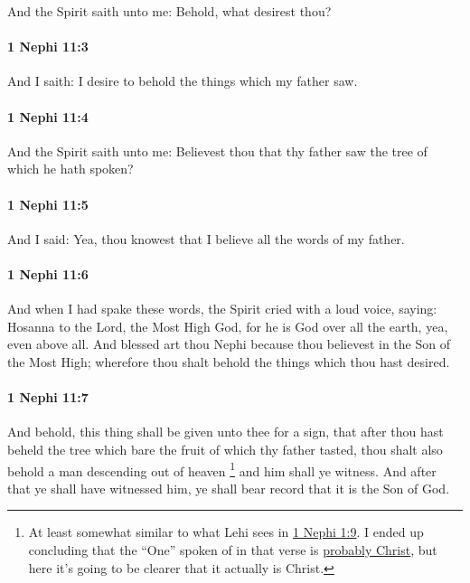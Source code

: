 			And the Spirit saith unto me:
			Behold, what desirest thou?

		\paragraph{1 Nephi 11:3} %
			\label{1NEPHI-11-3}

			And I saith:
			I desire to behold the things which my father saw.

		\paragraph{1 Nephi 11:4} %
			\label{1NEPHI-11-4}

			And the Spirit saith unto me:
			Believest thou that thy father saw the tree of which he hath spoken?

		\paragraph{1 Nephi 11:5} %
			\label{1NEPHI-11-5}

			And I said:
			Yea, thou knowest that I believe all the words of my father.

		\paragraph{1 Nephi 11:6} %
			\label{1NEPHI-11-6}

			And when I had spake these words,
			the Spirit cried with a loud voice, saying:
			Hosanna to the Lord, the Most High God,
			for he is God over all the earth, yea, even above all.
			And blessed art thou Nephi because thou believest in the Son of the Most High;
			wherefore thou shalt behold the things which thou hast desired.

		\paragraph{1 Nephi 11:7} %
			\label{1NEPHI-11-7}

			And behold, this thing shall be given unto thee for a sign,
			that after thou hast beheld the tree
			which bare the fruit of which thy father tasted,
			thou shalt also behold a man descending out of heaven%
				\footnote{%
					\label{1NEPHI-11-7-NOTE-man}%
					At least somewhat similar to what Lehi sees in \hyperref[1NEPHI-1-9]{1 Nephi 1:9}. I ended up concluding that the ``One'' spoken of in that verse is \hyperref[1NEPHI-1-9-NOTE-one]{probably Christ}, but here it's going to be clearer that it actually is Christ.
					}
			and him shall ye witness.
			And after that ye shall have witnessed him,
			ye shall bear record that it is the Son of God.

